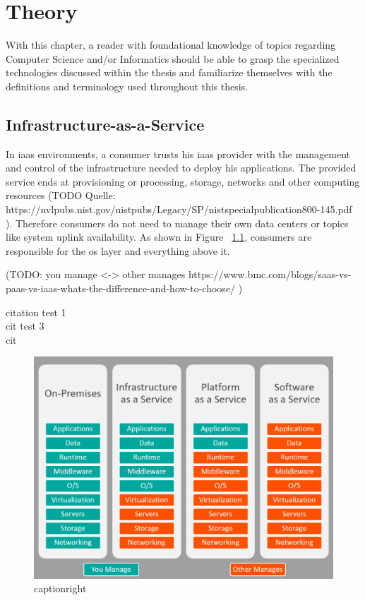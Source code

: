 
\chapter{Theory}
With this chapter, a reader with foundational knowledge of topics regarding Computer Science and/or Informatics should be able to grasp the specialized technologies discussed within the thesis and familiarize themselves with the definitions and terminology used throughout this thesis.

\section{Infrastructure-as-a-Service}
In \gls{iaas} environments, a consumer trusts his \gls{iaas} provider with the management and control of the infrastructure needed to deploy his applications.
The provided service ends at provisioning or processing, storage, networks and other computing resources \cite{nistcloud}
(TODO Quelle: https://nvlpubs.nist.gov/nistpubs/Legacy/SP/nistspecialpublication800-145.pdf ). 
Therefore consumers do not need to manage their own data centers or topics like system uplink availability.
As shown in Figure ~\ref{fig:servicecomparison}, consumers are responsible for the \gls{os} layer and everything above it.

(TODO: you manage <-> other manages https://www.bmc.com/blogs/saas-vs-paas-vs-iaas-whats-the-difference-and-how-to-choose/ )

citation test 1\cite{servicecomparison} \\
cit test 3~\cite{servicecomparison} \\
cit 

\begin{figure}[H]
\includegraphics[scale=0.4]{pictures/ServiceComparison.jpg} 
\caption{captionright\protect\footnotemark}
\label{fig:servicecomparison}
\end{figure}

